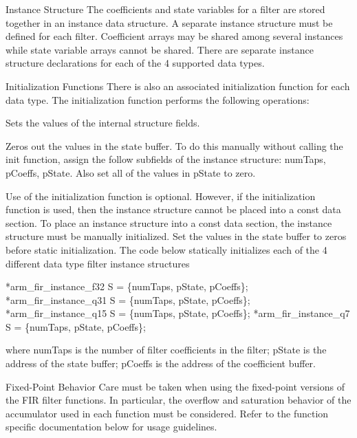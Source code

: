 \begin{DoxyParagraph}{Instance Structure}
The coefficients and state variables for a filter are stored together in an instance data structure. A separate instance structure must be defined for each filter. Coefficient arrays may be shared among several instances while state variable arrays cannot be shared. There are separate instance structure declarations for each of the 4 supported data types.
\end{DoxyParagraph}
\begin{DoxyParagraph}{Initialization Functions}
There is also an associated initialization function for each data type. The initialization function performs the following operations\+:
\begin{DoxyItemize}
\item Sets the values of the internal structure fields.
\item Zeros out the values in the state buffer. To do this manually without calling the init function, assign the follow subfields of the instance structure\+: num\+Taps, p\+Coeffs, p\+State. Also set all of the values in p\+State to zero.
\end{DoxyItemize}
\end{DoxyParagraph}
\begin{DoxyParagraph}{}
Use of the initialization function is optional. However, if the initialization function is used, then the instance structure cannot be placed into a const data section. To place an instance structure into a const data section, the instance structure must be manually initialized. Set the values in the state buffer to zeros before static initialization. The code below statically initializes each of the 4 different data type filter instance structures 
\begin{DoxyPre}
*arm\_fir\_instance\_f32 S = \{numTaps, pState, pCoeffs\};
*arm\_fir\_instance\_q31 S = \{numTaps, pState, pCoeffs\};
*arm\_fir\_instance\_q15 S = \{numTaps, pState, pCoeffs\};
*arm\_fir\_instance\_q7 S =  \{numTaps, pState, pCoeffs\};
  \end{DoxyPre}

\end{DoxyParagraph}
where {\ttfamily num\+Taps} is the number of filter coefficients in the filter; {\ttfamily p\+State} is the address of the state buffer; {\ttfamily p\+Coeffs} is the address of the coefficient buffer.

\begin{DoxyParagraph}{Fixed-\/\+Point Behavior}
Care must be taken when using the fixed-\/point versions of the F\+IR filter functions. In particular, the overflow and saturation behavior of the accumulator used in each function must be considered. Refer to the function specific documentation below for usage guidelines. 
\end{DoxyParagraph}


